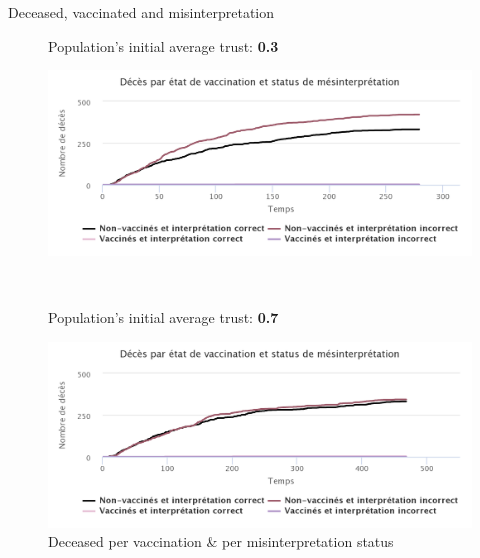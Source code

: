 \documentclass{beamer}
\begin{document}
\begin{frame}{Deceased, vaccinated and misinterpretation}
    \begin{figure}[htpb]
        \begin{center}
            \begin{minipage}[t]{0.3\textwidth}
                \vspace{1.5mm}
                Population's initial average trust: \textbf{0.3}
            \end{minipage}
            \begin{minipage}[t]{0.6\textwidth}
                \strut\vspace*{-\baselineskip}\newline\includegraphics[width=1.0\linewidth]{fig/trust_03_graph_dec_vacc_misint.png}
            \end{minipage}
            \\
            \begin{minipage}[t]{0.3\textwidth}
                \vspace{1.5mm}
                Population's initial average trust: \textbf{0.7}
            \end{minipage}
            \begin{minipage}[t]{0.6\textwidth}
                \strut\vspace*{-\baselineskip}\newline\includegraphics[width=1.0\linewidth]{fig/trust_07_graph_dec_vacc_misint.png}
            \end{minipage}
        \end{center}
        \caption{Deceased per vaccination \& per misinterpretation status}
    \end{figure}
\end{frame}
\end{document}
